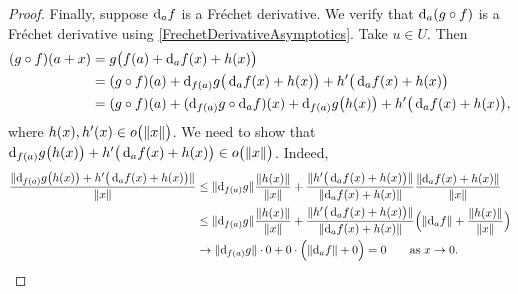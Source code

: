 \begin{proof}
Finally, suppose $\operatorname{d \!}{_a}f$ is a Fréchet derivative. We verify that $\operatorname{d \!}{_a}(g\circ f)$ is a Fréchet derivative using \ref{FrechetDerivativeAsymptotics}. Take $u\in U$. Then
\begin{align*}
(g\circ f)(a+x) &= g\big(f(a) + \diff{_af}(x) + h(x)\big) \\
&= (g\circ f)(a) + \diff{_{f(a)}g}\big(\diff{_af}(x) + h(x)\big) + h'\big(\diff{_af}(x) + h(x)\big) \\
&= (g\circ f)(a) + (\diff{_{f(a)}g}\circ \diff{_af})(x) + \diff{_{f(a)}g}\big(h(x)\big) + h'\big(\diff{_af}(x) + h(x)\big),
\end{align*}
where $h(x), h'(x) \in o\big(\lVert x\rVert\big)$. We need to show that $\operatorname{d \!}{_{f(a)}g}\big(h(x)\big) + h'\big(\operatorname{d \!}{_af}(x) + h(x)\big) \in o\big(\lVert x\rVert\big)$. Indeed,
\begin{align*}
\frac{\norm{\diff{_{f(a)}g}\big(h(x)\big) + h'\big(\diff{_af}(x) + h(x)\big)}}{\norm{x}} &\leq \norm{\diff{_{f(a)}g}}\frac{\norm{h(x)}}{\norm{x}} + \frac{\norm{h'\big(\diff{_af}(x) + h(x)\big)}}{\norm{\diff{_af}(x) + h(x)}}\frac{\norm{\diff{_af}(x) + h(x)}}{\norm{x}} \\
&\leq \norm{\diff{_{f(a)}g}}\frac{\norm{h(x)}}{\norm{x}} + \frac{\norm{h'\big(\diff{_af}(x) + h(x)\big)}}{\norm{\diff{_af}(x) + h(x)}}\Big(\norm{\diff{_af}} + \frac{\norm{h(x)}}{\norm{x}}\Big) \\
&\to \norm{\diff{_{f(a)}g}}\cdot 0 + 0\cdot \Big(\norm{\diff{_af}} + 0\Big) = 0 \qquad \text{as $x\to 0$}.
\end{align*}
\end{proof}

